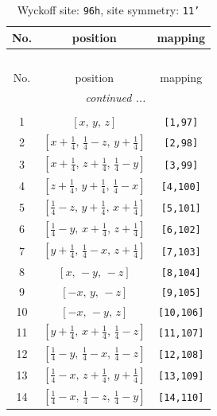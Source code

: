 \documentclass[fleqn,8pt]{jsarticle}
\begin{document}
\begin{longtable}{ccc}
\caption{Wyckoff site: {\tt 96h}, site symmetry: {\tt 11'}}
 \\
 \hline \hline
No. & position & mapping \\ \hline \endfirsthead

\multicolumn{2}{l}{\tablename\ \thetable{}} \\
 \hline \hline
No. & position & mapping \\ \hline \endhead

 \hline \hline
\multicolumn{2}{r}{\footnotesize\it continued ...} \\ \endfoot

 \hline \hline
\multicolumn{2}{r}{} \\ \endlastfoot

1 & $\left[ x,\, y,\, z \right]$ & {\tt [1,97]} \\ \hline
2 & $\left[ x + \frac{1}{4},\, \frac{1}{4} - z,\, y + \frac{1}{4} \right]$ & {\tt [2,98]} \\ \hline
3 & $\left[ x + \frac{1}{4},\, z + \frac{1}{4},\, \frac{1}{4} - y \right]$ & {\tt [3,99]} \\ \hline
4 & $\left[ z + \frac{1}{4},\, y + \frac{1}{4},\, \frac{1}{4} - x \right]$ & {\tt [4,100]} \\ \hline
5 & $\left[ \frac{1}{4} - z,\, y + \frac{1}{4},\, x + \frac{1}{4} \right]$ & {\tt [5,101]} \\ \hline
6 & $\left[ \frac{1}{4} - y,\, x + \frac{1}{4},\, z + \frac{1}{4} \right]$ & {\tt [6,102]} \\ \hline
7 & $\left[ y + \frac{1}{4},\, \frac{1}{4} - x,\, z + \frac{1}{4} \right]$ & {\tt [7,103]} \\ \hline
8 & $\left[ x,\, - y,\, - z \right]$ & {\tt [8,104]} \\ \hline
9 & $\left[ - x,\, y,\, - z \right]$ & {\tt [9,105]} \\ \hline
10 & $\left[ - x,\, - y,\, z \right]$ & {\tt [10,106]} \\ \hline
11 & $\left[ y + \frac{1}{4},\, x + \frac{1}{4},\, \frac{1}{4} - z \right]$ & {\tt [11,107]} \\ \hline
12 & $\left[ \frac{1}{4} - y,\, \frac{1}{4} - x,\, \frac{1}{4} - z \right]$ & {\tt [12,108]} \\ \hline
13 & $\left[ \frac{1}{4} - x,\, z + \frac{1}{4},\, y + \frac{1}{4} \right]$ & {\tt [13,109]} \\ \hline
14 & $\left[ \frac{1}{4} - x,\, \frac{1}{4} - z,\, \frac{1}{4} - y \right]$ & {\tt [14,110]} \\ \hline

\end{longtable}
\end{document}

